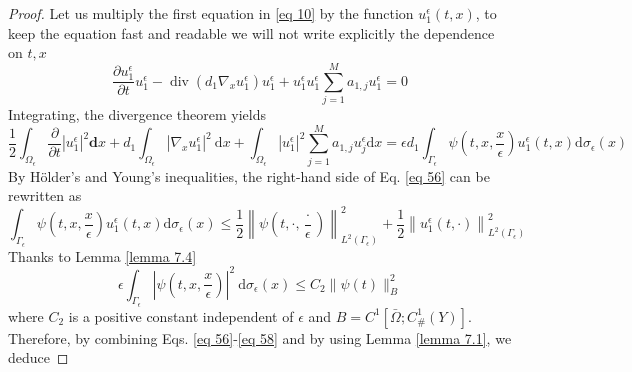 \begin{proof}
Let us multiply the first equation in \eqref{eq 10} by the function $u_{1}^{\epsilon}(t, x)$, to keep the equation fast and readable we will not write explicitly the dependence on $t,x$
$$\frac{\partial u_{1}^{\epsilon}}{\partial t}u_{1}^{\epsilon}-\operatorname{div}\left(d_{1} \nabla_{x} u_{1}^{\epsilon}\right)u_{1}^{\epsilon}+u_{1}^{\epsilon}u_{1}^{\epsilon} \sum_{j=1}^{M} a_{1, j} u_{1}^{\epsilon}=0$$
Integrating, the divergence theorem yields
\begin{equation}
\frac{1}{2}\int_{\Omega_{\epsilon}} \frac{\partial}{\partial t}\left|u_{1}^{\epsilon}\right|^{2} \mathbf{d} x+ d_{1} \int_{\Omega_{\epsilon}}\left|\nabla_{x} u_{1}^{\epsilon}\right|^{2} \mathrm{~d} x+\int_{\Omega_{\epsilon}}\left|u_{1}^{\epsilon}\right|^{2} \sum_{j=1}^{M} a_{1, j} u_{j}^{\epsilon} \mathrm{d} x =\epsilon d_{1} \int_{\Gamma_{\epsilon}} \psi\left(t, x, \frac{x}{\epsilon}\right) u_{1}^{\epsilon}(t, x) \mathrm{d} \sigma_{\epsilon}(x)
\label{eq 56}\end{equation}
By Hölder's and Young's inequalities, the right-hand side of Eq. \eqref{eq 56} can be rewritten as
\begin{equation}
  \int_{\Gamma_{\epsilon}} \psi\left(t, x, \frac{x}{\epsilon}\right) u_{1}^{\epsilon}(t, x) \mathrm{d} \sigma_{\epsilon}(x) \leq \frac{1}{2}\left\|\psi\left(t, \cdot, \frac{\cdot}{\epsilon}\right)\right\|_{L^{2}\left(\Gamma_{\epsilon}\right)}^{2}+\frac{1}{2}\left\|u_{1}^{\epsilon}(t, \cdot)\right\|_{L^{2}\left(\Gamma_{\epsilon}\right)}^{2}
\label{eq 57}\end{equation}
Thanks to Lemma \eqref{lemma 7.4}
\begin{equation}
  \epsilon \int_{\Gamma_{\epsilon}}\left|\psi\left(t, x, \frac{x}{\epsilon}\right)\right|^{2} \mathrm{~d} \sigma_{\epsilon}(x) \leq C_{2}\|\psi(t)\|_{B}^{2}
\label{eq 58}\end{equation}
where $C_{2}$ is a positive constant independent of $\epsilon$ and $B=C^{1}\left[\bar{\Omega} ; C_{\#}^{1}(Y)\right]$. Therefore, by combining Eqs. \eqref{eq 56}-\eqref{eq 58} and by using Lemma \eqref{lemma 7.1}, we deduce

\end{proof}
